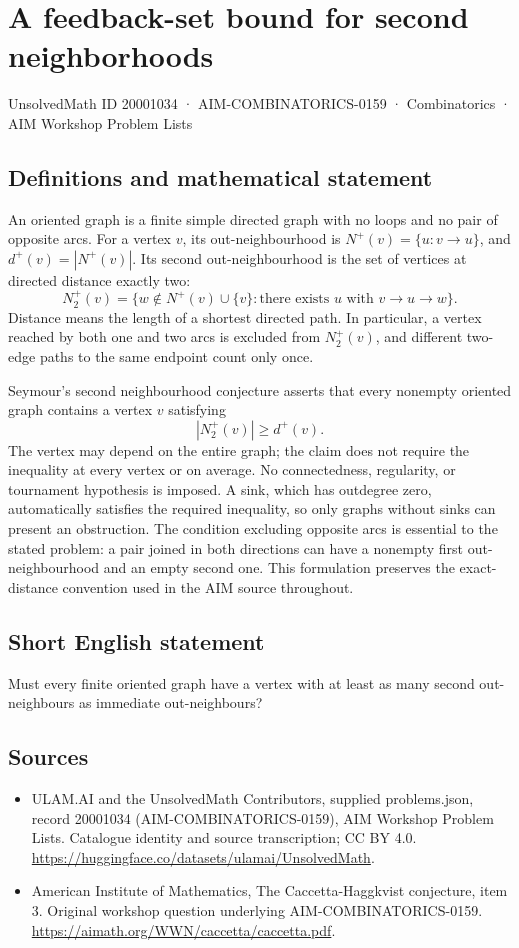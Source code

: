 \documentclass[11pt,a4paper]{article}
\begin{document}
\section*{A feedback-set bound for second neighborhoods}\label{20001034}
{\small UnsolvedMath ID 20001034 · AIM-COMBINATORICS-0159 · Combinatorics · AIM Workshop Problem Lists}
\subsection{Definitions and mathematical statement}
An oriented graph is a finite simple directed graph with no loops and
no pair of opposite arcs. For a vertex $v$, its out-neighbourhood is
$N^+(v)=\{u:v\to u\}$, and $d^+(v)=|N^+(v)|$.
Its second out-neighbourhood is the set of vertices at directed distance
exactly two:
\[
 N_2^+(v)=\{w\notin N^+(v)\cup\{v\}:\text{there exists }u
                                   \text{ with }v\to u\to w\}.
\]
Distance means the length of a shortest directed path. In particular,
a vertex reached by both one and two arcs is excluded from $N_2^+(v)$,
and different two-edge paths to the same endpoint count only once.

Seymour's second neighbourhood conjecture asserts that every nonempty
oriented graph contains a vertex $v$ satisfying
\[
                            |N_2^+(v)|\ge d^+(v).
\]
The vertex may depend on the entire graph; the claim does not require
the inequality at every vertex or on average. No connectedness,
regularity, or tournament hypothesis is imposed. A sink, which has
outdegree zero, automatically satisfies the required inequality, so
only graphs without sinks can present an obstruction.
The condition excluding opposite arcs is essential to the stated
problem: a pair joined in both directions can have a nonempty first
out-neighbourhood and an empty second one. This formulation preserves
the exact-distance convention used in the AIM source throughout.
\subsection{Short English statement}
Must every finite oriented graph have a vertex with at least as many second out-neighbours as immediate out-neighbours?
\subsection{Sources}
\begin{itemize}
\item[S1] ULAM.AI and the UnsolvedMath Contributors, supplied problems.json, record 20001034 (AIM-COMBINATORICS-0159), AIM Workshop Problem Lists. Catalogue identity and source transcription; CC BY 4.0.
\url{https://huggingface.co/datasets/ulamai/UnsolvedMath}.
\item[S2] American Institute of Mathematics, The Caccetta-Haggkvist conjecture, item 3. Original workshop question underlying AIM-COMBINATORICS-0159.
\url{https://aimath.org/WWN/caccetta/caccetta.pdf}.
\end{itemize}
\end{document}
